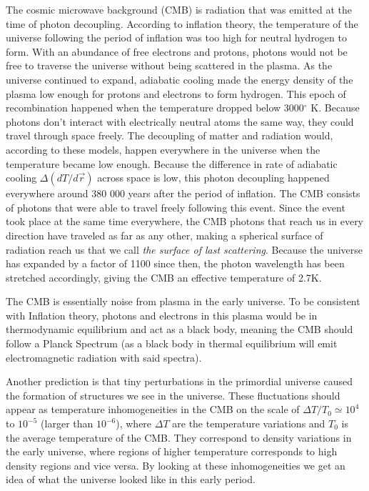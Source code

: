 \documentclass{emulateapj}
\begin{document}
The cosmic microwave background (CMB) is radiation that was emitted at the time of photon decoupling. According to inflation theory, the temperature of the universe following the period of inflation was too high for neutral hydrogen to form. With an abundance of free electrons and protons, photons would not be free to traverse the universe without being scattered in the plasma. As the universe continued to expand, adiabatic cooling made the energy density of the plasma low enough for protons and electrons to form hydrogen. This epoch of recombination happened when the temperature dropped below 3000$^\circ$ K. Because photons don't interact with electrically neutral atoms the same way, they could travel through space freely. The decoupling of matter and radiation would, according to these models, happen everywhere in the universe when the temperature became low enough. Because the difference in rate of adiabatic cooling $\Delta(dT/d\vec{r})$ across space is low, this photon decoupling happened everywhere around 380 000 years after the period of inflation. The CMB consists of photons that were able to travel freely following this event. Since the event took place at the same time everywhere, the CMB photons that reach us in every direction have traveled as far as any other, making a spherical surface of radiation reach us that we call \textit{the surface of last scattering}. Because the universe has expanded by a factor of 1100 since then, the photon wavelength has been stretched accordingly, giving the CMB an effective temperature of 2.7K.   

The CMB is essentially noise from plasma in the early universe. To be consistent with Inflation theory, photons and electrons in this plasma would be in thermodynamic equilibrium and act as a black body, meaning the CMB should follow a Planck Spectrum (as a black body in thermal equilibrium will emit electromagnetic radiation with said spectra).   

Another prediction is that tiny perturbations in the primordial universe caused the formation of structures we see in the universe. These fluctuations should appear as temperature inhomogeneities in the CMB on the scale of $\Delta T / T_0 \simeq 10^{4}$ to $10^{-5}$ (larger than $10^{-6}$), where $\Delta T$  are the temperature variations and $T_0$ is the average temperature of the CMB. They correspond to density variations in the early universe, where regions of higher temperature corresponds to high density regions and vice versa. By looking at these inhomogeneities we get an idea of what the universe looked like in this early period.  
\end{document}
